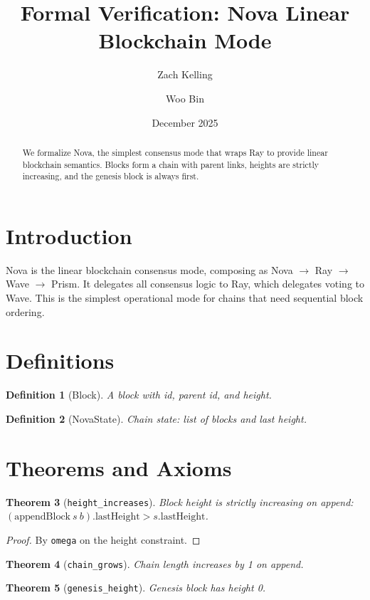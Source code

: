 \documentclass[11pt]{article}
\title{Formal Verification: Nova Linear Blockchain Mode}
\author{Zach Kelling \and Woo Bin}
\date{December 2025}
\newtheorem{theorem}{Theorem}
\newtheorem{definition}[theorem]{Definition}
\begin{document}
\maketitle

\begin{abstract}
We formalize Nova, the simplest consensus mode that wraps Ray to provide linear blockchain semantics. Blocks form a chain with parent links, heights are strictly increasing, and the genesis block is always first.
\end{abstract}

\section{Introduction}
Nova is the linear blockchain consensus mode, composing as Nova $\to$ Ray $\to$ Wave $\to$ Prism. It delegates all consensus logic to Ray, which delegates voting to Wave. This is the simplest operational mode for chains that need sequential block ordering.

\section{Definitions}
\begin{definition}[Block]
A block with id, parent id, and height.
\end{definition}

\begin{definition}[NovaState]
Chain state: list of blocks and last height.
\end{definition}


\section{Theorems and Axioms}
\begin{theorem}[\texttt{height\_increases}]
Block height is strictly increasing on append: $(\text{appendBlock}~s~b).\text{lastHeight} > s.\text{lastHeight}$.
\end{theorem}
\begin{proof}
By \texttt{omega} on the height constraint.
\end{proof}

\begin{theorem}[\texttt{chain\_grows}]
Chain length increases by 1 on append.
\end{theorem}

\begin{theorem}[\texttt{genesis\_height}]
Genesis block has height 0.
\end{theorem}
\end{document}
